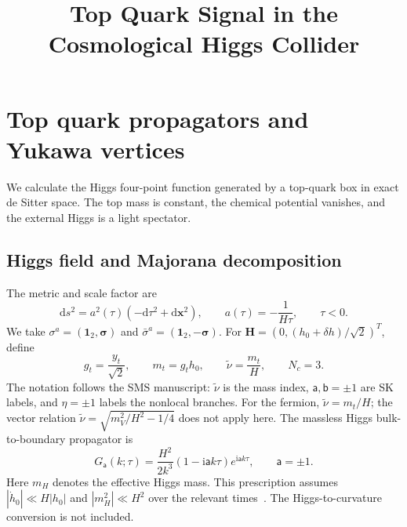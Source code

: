 \documentclass[a4paper,12pt]{article}
\title{\Large\textbf{Top Quark Signal in the Cosmological Higgs Collider}}
\author{}
\newcommand{\ii}{\mathrm i}
\newcommand{\mb}{\mathbf}
\newcommand{\tn}{\tilde\nu}
\def\aa{\mathsf a}
\newcommand{\bb}{\mathsf b}
\newcommand{\di}{\mathrm d}
\newcommand{\bs}{\bm\sigma}
\newcommand{\one}{\mathbf1_2}
\begin{document}
\date{}
\maketitle


\section{Top quark propagators and Yukawa vertices}
We calculate the Higgs four-point function generated by a top-quark box
in exact de Sitter space. The top mass is constant, the chemical potential
vanishes, and the external Higgs is a light spectator. 

\subsection{Higgs field and Majorana decomposition}
The metric and scale factor are
\begin{equation}
 \di s^2=a^2(\tau)(-\di\tau^2+\di\mb x^2),\qquad
 a(\tau)=-\frac1{H\tau},\qquad \tau<0.
\end{equation}
We take $\sigma^a=(\one,\bs)$ and $\bar\sigma^a=(\one,-\bs)$.
For $\mb H=(0,(h_0+\delta h)/\sqrt2)^T$, define
\begin{equation}
 g_t=\frac{y_t}{\sqrt2},\qquad m_t=g_th_0,\qquad
 \tn=\frac{m_t}{H},\qquad N_c=3.
\end{equation}
The notation follows the SMS manuscript: $\tn$ is the mass index,
$\aa,\bb=\pm1$ are SK labels, and $\eta=\pm1$ labels the nonlocal
branches. For the fermion, $\tn=m_t/H$; the vector relation
$\tn=\sqrt{m_V^2/H^2-1/4}$ does not apply here.
The massless Higgs bulk-to-boundary propagator is
\begin{equation}
 G_{\aa}(k;\tau)=\frac{H^2}{2k^3}(1-\ii \aa k\tau)e^{\ii \aa k\tau},\qquad \aa=\pm1.
 \label{eq:higgs}
\end{equation}
Here $m_H$ denotes the effective Higgs mass.
This prescription assumes $|\dot h_0|\ll H|h_0|$ and
$|m_H^2|\ll H^2$ over the relevant times~\cite{lu}.
The Higgs-to-curvature conversion is not included.
\end{document}
